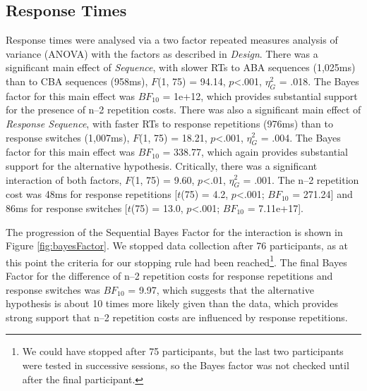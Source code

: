 \documentclass[a4paper, doc, natbib]{apa6}
\begin{document}
\subsection{Response Times}
Response times were analysed via a two factor repeated measures analysis of variance (ANOVA) with the factors as described in \emph{Design}. There was a significant main effect of \emph{Sequence}, with slower RTs to ABA sequences (1,025ms) than to CBA sequences (958ms), $F$(1, 75) = 94.14, $p$<.001, $\eta_G^2$ = .018. The Bayes factor for this main effect was $BF_{10}$ = 1e+12, which provides substantial support for the presence of n--2 repetition costs. There was also a significant main effect of \emph{Response Sequence}, with faster RTs to response repetitions (976ms) than to response switches (1,007ms), $F$(1, 75) = 18.21, $p$<.001, $\eta_G^2$ = .004. The Bayes factor for this main effect was $BF_{10}$ = 338.77, which again provides substantial support for the alternative hypothesis. Critically, there was a significant interaction of both factors, $F$(1, 75) = 9.60, $p$<.01, $\eta_G^2$ = .001. The n--2 repetition cost was 48ms for response repetitions [$t$(75) = 4.2, $p$<.001; $BF_{10}$ = 271.24] and 86ms for response switches [$t$(75) = 13.0, $p$<.001; $BF_{10}$ = 7.11e+17]. 

The progression of the Sequential Bayes Factor for the interaction is shown in Figure \ref{fig:bayesFactor}. We stopped data collection after 76 participants, as at this point the criteria for our stopping rule had been reached\footnote{We could have stopped after 75 participants, but the last two participants were tested in successive sessions, so the Bayes factor was not checked until after the final participant.}. The final Bayes Factor for the difference of n--2 repetition costs for response repetitions and response switches was $BF_{10}$ = 9.97, which suggests that the alternative hypothesis is about 10 times more likely given than the data, which provides strong support that n--2 repetition costs are influenced by response repetitions.
\end{document}
